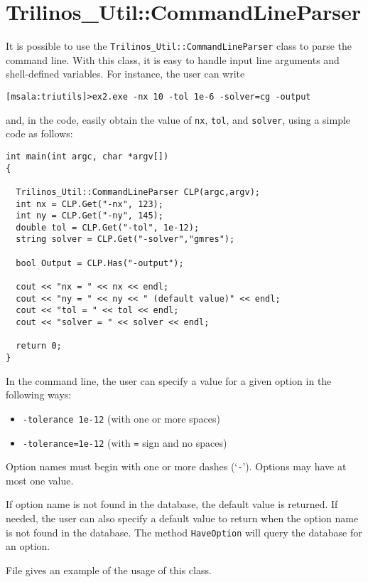 
\section{Trilinos\_Util::CommandLineParser}
\label{sec:triutils:CLP}

It is possible to use the \newline
\verb!Trilinos_Util::CommandLineParser! class to parse the command line.
With this class, it is easy to handle input line arguments and
shell-defined variables. For instance, the user can write
\begin{verbatim}
[msala:triutils]>ex2.exe -nx 10 -tol 1e-6 -solver=cg -output
\end{verbatim}
and, in the code, easily obtain the value of {\tt nx}, {\tt tol}, and
{\tt solver}, using a simple code as follows:
\begin{verbatim}
int main(int argc, char *argv[])
{

  Trilinos_Util::CommandLineParser CLP(argc,argv);
  int nx = CLP.Get("-nx", 123);
  int ny = CLP.Get("-ny", 145);
  double tol = CLP.Get("-tol", 1e-12);
  string solver = CLP.Get("-solver","gmres");

  bool Output = CLP.Has("-output");

  cout << "nx = " << nx << endl;
  cout << "ny = " << ny << " (default value)" << endl;
  cout << "tol = " << tol << endl;
  cout << "solver = " << solver << endl;

  return 0;
}
\end{verbatim}
In the command line, the user can specify a value for a given option in
the following ways:
\begin{itemize}
\item \verb!-tolerance 1e-12! (with one or more spaces)
\item \verb!-tolerance=1e-12! (with \verb!=! sign and no spaces)
\end{itemize}

Option names must begin with one or more dashes (`\verb!-!'). Options
may have at most one value.
 
If option name is not found in the database, the default value is
returned. If needed, the user can also specify a default value to return
when the option name is not found in the database. The method
\verb!HaveOption! will query the database for an option.

File  gives an example of the usage of this class.
 
